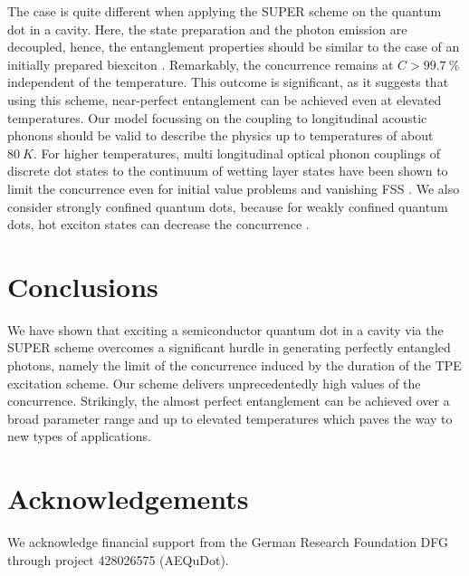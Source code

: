 \documentclass[%
 reprint,superscriptaddress,
 amsmath,amssymb,
 aps]{revtex4-2}
\begin{document}
The case is quite different when applying the SUPER scheme on the quantum dot in a cavity. Here, the state preparation and the photon emission are decoupled, hence, the entanglement properties should be similar to the case of an initially prepared biexciton \cite{carmele, seidelmann2019from}.
Remarkably, the concurrence remains at $C>\SI{99.7}{\percent}$ independent of the temperature. This outcome is significant, as it suggests that using this scheme, near-perfect entanglement can be achieved even at elevated temperatures. Our model focussing on the coupling to longitudinal acoustic phonons should be valid to describe the physics up to temperatures of about $\SI{80}{K}$. For higher temperatures, multi longitudinal optical phonon couplings of discrete dot states to the continuum of wetting layer states have been shown to limit the concurrence even for initial value problems and vanishing FSS \cite{carmele2010formation}. We also consider strongly confined quantum dots, because for weakly confined quantum dots, hot exciton states can decrease the concurrence \cite{lehner2023beyond}. %

\section{Conclusions}
We have shown that exciting a semiconductor quantum dot in a cavity via the SUPER scheme overcomes a significant hurdle in generating perfectly entangled photons, namely the limit of the concurrence induced by the duration of the TPE excitation scheme. Our scheme delivers unprecedentedly high values of the concurrence. Strikingly, the almost perfect entanglement can be achieved over a broad parameter range and up to elevated temperatures which paves the way to new types of applications.


\section{Acknowledgements}
We acknowledge financial support from the German Research Foundation DFG through project 428026575 (AEQuDot). 

\newpage



\newpage
\appendix
\end{document}
